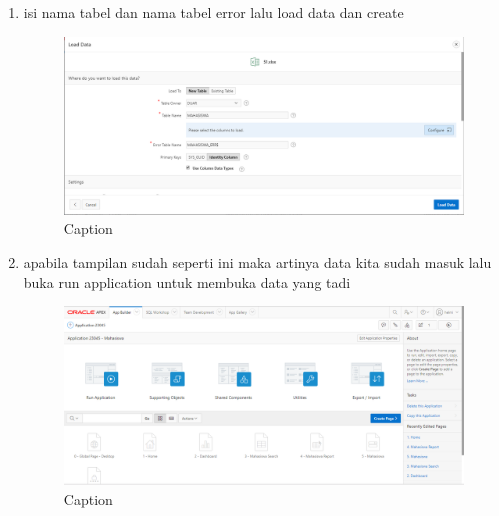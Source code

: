 ﻿\documentclass{article}
\begin{document}
\begin{enumerate}
    \item isi nama tabel dan nama tabel error lalu load data dan create
    \begin{figure}
        \centering
        \includegraphics[scale=0.35]{gambar/6.PNG}
        \caption{Caption}
        \label{fig:my_label}
    \end{figure}
    
        \item apabila tampilan sudah seperti ini maka artinya data kita sudah masuk lalu buka run application untuk membuka data yang tadi
    \begin{figure}
        \centering
        \includegraphics[scale=0.35]{gambar/7.PNG}
        \caption{Caption}
        \label{fig:my_label}
    \end{figure}
    

\end{enumerate}
\end{document}

